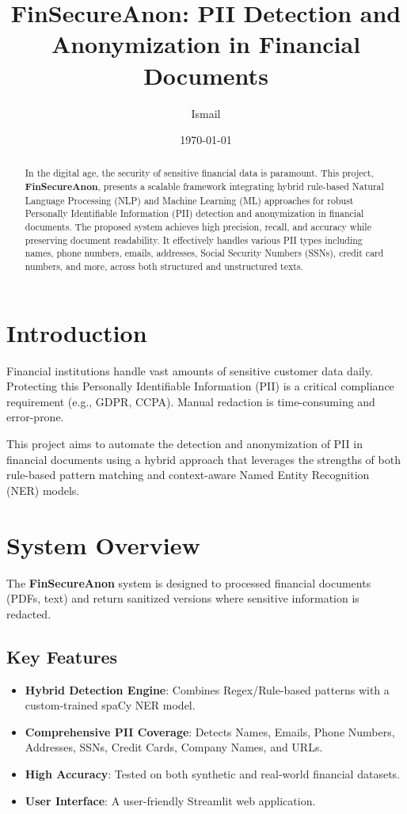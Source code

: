 \documentclass[12pt,a4paper]{article}
\title{\textbf{FinSecureAnon: PII Detection and Anonymization in Financial Documents}}
\author{Ismail} %
\date{\today}
\begin{document}
\maketitle

\begin{abstract}
    In the digital age, the security of sensitive financial data is paramount. This project, \textbf{FinSecureAnon}, presents a scalable framework integrating hybrid rule-based Natural Language Processing (NLP) and Machine Learning (ML) approaches for robust Personally Identifiable Information (PII) detection and anonymization in financial documents. The proposed system achieves high precision, recall, and accuracy while preserving document readability. It effectively handles various PII types including names, phone numbers, emails, addresses, Social Security Numbers (SSNs), credit card numbers, and more, across both structured and unstructured texts.
\end{abstract}

\tableofcontents
\newpage

\section{Introduction}
Financial institutions handle vast amounts of sensitive customer data daily. Protecting this Personally Identifiable Information (PII) is a critical compliance requirement (e.g., GDPR, CCPA). Manual redaction is time-consuming and error-prone. 

This project aims to automate the detection and anonymization of PII in financial documents using a hybrid approach that leverages the strengths of both rule-based pattern matching and context-aware Named Entity Recognition (NER) models.

\section{System Overview}
The \textbf{FinSecureAnon} system is designed to processed financial documents (PDFs, text) and return sanitized versions where sensitive information is redacted.

\subsection{Key Features}
\begin{itemize}
    \item \textbf{Hybrid Detection Engine}: Combines Regex/Rule-based patterns with a custom-trained spaCy NER model.
    \item \textbf{Comprehensive PII Coverage}: Detects Names, Emails, Phone Numbers, Addresses, SSNs, Credit Cards, Company Names, and URLs.
    \item \textbf{High Accuracy}: Tested on both synthetic and real-world financial datasets.
    \item \textbf{User Interface}: A user-friendly Streamlit web application.
\end{itemize}
\end{document}
